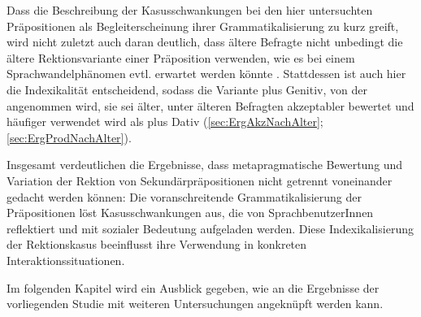 Dass die Beschreibung der Kasusschwankungen bei den hier untersuchten Präpositionen als Begleiterscheinung ihrer Grammatikalisierung zu kurz greift, wird nicht zuletzt auch daran deutlich, dass ältere Befragte nicht unbedingt die ältere {Rektions\-va\-rian\-te} einer Präposition verwenden, wie es bei einem Sprachwandelphänomen evtl. erwartet werden könnte \citep[s.][40]{Preston.1991}. 
Stattdessen ist auch hier die Indexikalität entscheidend, sodass die Variante \dank{} plus Genitiv, von der angenommen wird, sie sei älter, unter älteren Befragten akzeptabler bewertet und häufiger verwendet wird als \dank{} plus Dativ (\autoref{sec:ErgAkzNachAlter}; \autoref{sec:ErgProdNachAlter}). 

Insgesamt verdeutlichen die Ergebnisse, dass metapragmatische Bewertung %
und Variation %
der Rektion von Sekundärpräpositionen nicht getrennt voneinander gedacht werden können: 
Die voranschreitende Grammatikalisierung der Präpositionen löst Kasusschwankungen aus, die von SprachbenutzerInnen reflektiert und mit sozialer Bedeutung aufgeladen werden. 
Diese Indexikalisierung der Rektionskasus beeinflusst ihre Verwendung in konkreten Interaktionssituationen. 

Im folgenden Kapitel wird ein Ausblick gegeben, wie an die Ergebnisse der vorliegenden Studie mit weiteren Untersuchungen angeknüpft werden kann. 
